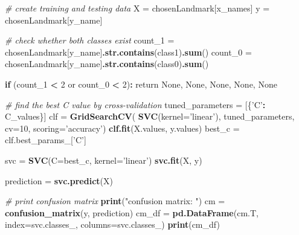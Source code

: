 \documentclass[10pt,letterpaper]{article}
\newenvironment{Shaded}{\begin{snugshade}}{\end{snugshade}}
\newcommand{\KeywordTok}[1]{\textcolor[rgb]{0.13,0.29,0.53}{\textbf{#1}}}
\newcommand{\DataTypeTok}[1]{\textcolor[rgb]{0.13,0.29,0.53}{#1}}
\newcommand{\DecValTok}[1]{\textcolor[rgb]{0.00,0.00,0.81}{#1}}
\newcommand{\StringTok}[1]{\textcolor[rgb]{0.31,0.60,0.02}{#1}}
\newcommand{\CommentTok}[1]{\textcolor[rgb]{0.56,0.35,0.01}{\textit{#1}}}
\newcommand{\ControlFlowTok}[1]{\textcolor[rgb]{0.13,0.29,0.53}{\textbf{#1}}}
\newcommand{\OperatorTok}[1]{\textcolor[rgb]{0.81,0.36,0.00}{\textbf{#1}}}
\newcommand{\NormalTok}[1]{#1}
\begin{document}
\begin{Shaded}
\begin{Highlighting}[]
    \CommentTok{# create training and testing data}
\NormalTok{    X =}\StringTok{ }\NormalTok{chosenLandmark[x_names]}
\NormalTok{    y =}\StringTok{ }\NormalTok{chosenLandmark[y_name]}

    \CommentTok{# check whether both classes exist}
\NormalTok{    count_}\DecValTok{1}\NormalTok{ =}\StringTok{ }\NormalTok{chosenLandmark[y_name]}\KeywordTok{.str.contains}\NormalTok{(class1)}\KeywordTok{.sum}\NormalTok{()}
\NormalTok{    count_}\DecValTok{0}\NormalTok{ =}\StringTok{ }\NormalTok{chosenLandmark[y_name]}\KeywordTok{.str.contains}\NormalTok{(class0)}\KeywordTok{.sum}\NormalTok{()}

    \ControlFlowTok{if}\NormalTok{ (count_}\DecValTok{1} \OperatorTok{<}\StringTok{ }\DecValTok{2}\NormalTok{ or count_}\DecValTok{0} \OperatorTok{<}\StringTok{ }\DecValTok{2}\NormalTok{)}\OperatorTok{:}
\StringTok{        }\NormalTok{return None, None, None, None, None}

    \CommentTok{# find the best C value by cross-validation}
\NormalTok{    tuned_parameters =}\StringTok{ }\NormalTok{[\{}\StringTok{'C'}\OperatorTok{:}\StringTok{ }\NormalTok{C_values\}]}
\NormalTok{    clf =}\StringTok{ }\KeywordTok{GridSearchCV}\NormalTok{(}
        \KeywordTok{SVC}\NormalTok{(}\DataTypeTok{kernel=}\StringTok{'linear'}\NormalTok{),}
\NormalTok{        tuned_parameters, }\DataTypeTok{cv=}\DecValTok{10}\NormalTok{, }\DataTypeTok{scoring=}\StringTok{'accuracy'}\NormalTok{)}
    \KeywordTok{clf.fit}\NormalTok{(X.values, y.values)}
\NormalTok{    best_c =}\StringTok{ }\NormalTok{clf.best_params_[}\StringTok{'C'}\NormalTok{]}
    
\NormalTok{    svc =}\StringTok{ }\KeywordTok{SVC}\NormalTok{(}\DataTypeTok{C=}\NormalTok{best_c, }\DataTypeTok{kernel=}\StringTok{'linear'}\NormalTok{)}
    \KeywordTok{svc.fit}\NormalTok{(X, y)}
    
\NormalTok{    prediction =}\StringTok{ }\KeywordTok{svc.predict}\NormalTok{(X)}

    \CommentTok{# print confusion matrix}
    \KeywordTok{print}\NormalTok{(}\StringTok{"confusion matrix: "}\NormalTok{)}
\NormalTok{    cm =}\StringTok{ }\KeywordTok{confusion_matrix}\NormalTok{(y, prediction)}
\NormalTok{    cm_df =}\StringTok{ }\KeywordTok{pd.DataFrame}\NormalTok{(cm.T, }\DataTypeTok{index=}\NormalTok{svc.classes_, }\DataTypeTok{columns=}\NormalTok{svc.classes_)}
    \KeywordTok{print}\NormalTok{(cm_df)}


\end{Highlighting}
\end{Shaded}
\end{document}
